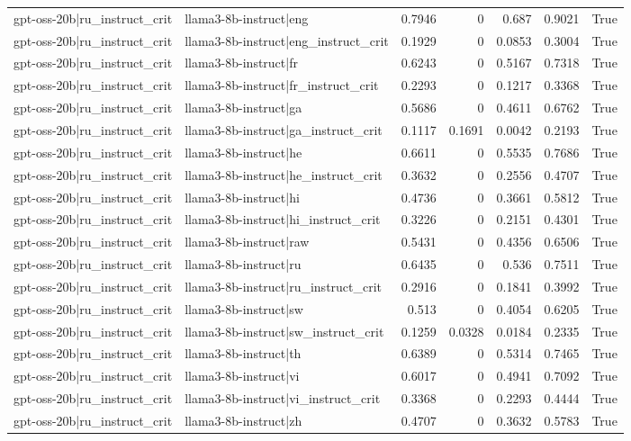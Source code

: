 \begin{table}
\begin{tabular}{l l r r r r l}
gpt-oss-20b|ru_instruct_crit & llama3-8b-instruct|eng & 0.7946 & 0 & 0.687 & 0.9021 & True \\
gpt-oss-20b|ru_instruct_crit & llama3-8b-instruct|eng_instruct_crit & 0.1929 & 0 & 0.0853 & 0.3004 & True \\
gpt-oss-20b|ru_instruct_crit & llama3-8b-instruct|fr & 0.6243 & 0 & 0.5167 & 0.7318 & True \\
gpt-oss-20b|ru_instruct_crit & llama3-8b-instruct|fr_instruct_crit & 0.2293 & 0 & 0.1217 & 0.3368 & True \\
gpt-oss-20b|ru_instruct_crit & llama3-8b-instruct|ga & 0.5686 & 0 & 0.4611 & 0.6762 & True \\
gpt-oss-20b|ru_instruct_crit & llama3-8b-instruct|ga_instruct_crit & 0.1117 & 0.1691 & 0.0042 & 0.2193 & True \\
gpt-oss-20b|ru_instruct_crit & llama3-8b-instruct|he & 0.6611 & 0 & 0.5535 & 0.7686 & True \\
gpt-oss-20b|ru_instruct_crit & llama3-8b-instruct|he_instruct_crit & 0.3632 & 0 & 0.2556 & 0.4707 & True \\
gpt-oss-20b|ru_instruct_crit & llama3-8b-instruct|hi & 0.4736 & 0 & 0.3661 & 0.5812 & True \\
gpt-oss-20b|ru_instruct_crit & llama3-8b-instruct|hi_instruct_crit & 0.3226 & 0 & 0.2151 & 0.4301 & True \\
gpt-oss-20b|ru_instruct_crit & llama3-8b-instruct|raw & 0.5431 & 0 & 0.4356 & 0.6506 & True \\
gpt-oss-20b|ru_instruct_crit & llama3-8b-instruct|ru & 0.6435 & 0 & 0.536 & 0.7511 & True \\
gpt-oss-20b|ru_instruct_crit & llama3-8b-instruct|ru_instruct_crit & 0.2916 & 0 & 0.1841 & 0.3992 & True \\
gpt-oss-20b|ru_instruct_crit & llama3-8b-instruct|sw & 0.513 & 0 & 0.4054 & 0.6205 & True \\
gpt-oss-20b|ru_instruct_crit & llama3-8b-instruct|sw_instruct_crit & 0.1259 & 0.0328 & 0.0184 & 0.2335 & True \\
gpt-oss-20b|ru_instruct_crit & llama3-8b-instruct|th & 0.6389 & 0 & 0.5314 & 0.7465 & True \\
gpt-oss-20b|ru_instruct_crit & llama3-8b-instruct|vi & 0.6017 & 0 & 0.4941 & 0.7092 & True \\
gpt-oss-20b|ru_instruct_crit & llama3-8b-instruct|vi_instruct_crit & 0.3368 & 0 & 0.2293 & 0.4444 & True \\
gpt-oss-20b|ru_instruct_crit & llama3-8b-instruct|zh & 0.4707 & 0 & 0.3632 & 0.5783 & True \\

\end{tabular}
\end{table}
